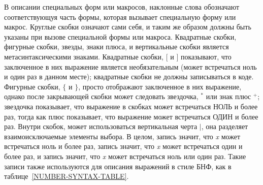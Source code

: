 В описании специальных форм или макросов, наклонные слова обозначают
соответствующуя часть формы, которая вызывает специальную форму или макрос.
Круглые скобки означают сами себя, и таким же образом должны быть указаны при
вызове специальной формы или макроса.
Квадратные скобки, фигурные скобки, звезды, знаки плюса, и вертикальные скобки
является метасинтаксическими знаками.
Квадратные скобки,
$\lbrack$ и $\rbrack$ показывают, что заключенное в них выражение является
необязательным (может встречаться ноль и один раз в данном месте); квадратные
скобки не должны записываться в коде.
Фигурные скобки, $\lbrace$ и $\rbrace$, просто отображают заключенное в них
выражение, однако после закрывающей скобки может следовать звездочка, ${}^*$ или
знак плюс ${}^+$; звездочка показывает, что выражение в скобках может
встречаться НОЛЬ и более раз, тогда как плюс показывает, что выражение может
встречаться ОДИН и более раз. Внутри скобок, может использоваться вертикальная
черта $|$, она разделяет взаимоисключаемые элементы выбора.
В целом, запись  значит, что \textit{x} может встречаться ноль и
более раз, запись  значит, что \textit{x} может встречаться один и
более раз, и запись  значит, что \textit{x} может встречаться ноль или
один раз. Такие записи также используются для описания выражений в стиле БНФ,
как в таблице~\ref{NUMBER-SYNTAX-TABLE}.

